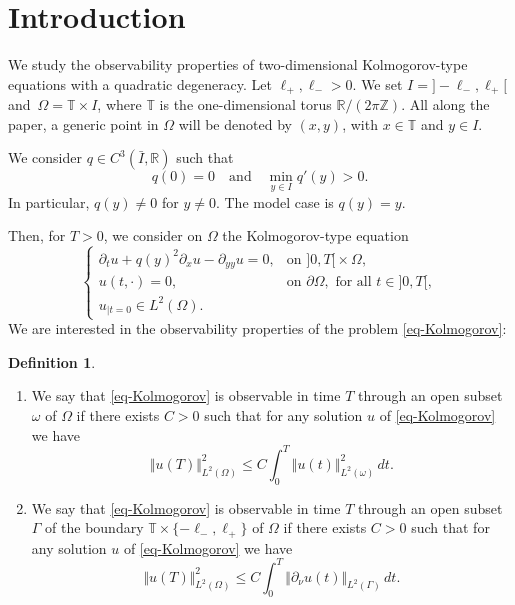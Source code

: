 \documentclass[JEP,XML,SOM,Unicode]{cedram}
\theoremstyle{plain}
\theoremstyle{definition}
\newtheorem{definition}[theorem]{Definition}
\newcommand{\nr}[1]{\Vert #1\Vert}
\newcommand{\1}{\mathds 1}
\newcommand{\R}{\mathbb{R}}
\newcommand{\Z}{\mathbb{Z}}
\newcommand{\T}{\mathbb{T}}
\let\G\Gamma
\let\o\omega
\let\O\Omega
\begin{document}
\maketitle
\vspace*{-\baselineskip}\enlargethispage{\baselineskip}%
\tableofcontents
\mainmatter

\section{Introduction}

We study the observability properties of two-dimensional Kolmogorov-type equations with a quadratic degeneracy. Let $\ell_+, \ell_- >0$. We set $I ={} ]-\ell_-,\ell_+[$ and~$\O = \T \times I$, where $\T$ is the one-dimensional torus $\R / (2 \pi \Z)$. All along the paper, a generic point in $\O$ will be denoted by $(x,y)$, with $x \in \T$ and $y \in I$.

We consider $q \in C^3 (\bar I,\R)$ such that
\[
q(0) = 0 \quad \text{and} \quad \min_{y \in I} q'(y) > 0.
\]
In particular, $q(y) \neq 0$ for $y \neq 0$. The model case is $q(y) = y$.

Then, for $T > 0$, we consider on $\O$ the Kolmogorov-type equation
\begin{equation} \label{eq-Kolmogorov}
\begin{cases}
\partial_t u + q(y)^2 \partial_x u - \partial_{yy} u = 0, & \text{on } ]0,T[{}\times \O,\\
u(t,\cdot) = 0, & \text{on } \partial\O, \text{ for all } t \in{}]0,T[,\\
u_{|t=0} \in L^2 (\O).
\end{cases}
\end{equation}
We are interested in the observability properties of the problem \eqref{eq-Kolmogorov}:

\skpt
\begin{definition}
\begin{enumerate}
\item We say that \eqref{eq-Kolmogorov} is observable in time $T$ through an open subset $\omega$ of $\O$ if there exists $C > 0$ such that for any solution $u$ of \eqref{eq-Kolmogorov} we have
\begin{equation} \label{eq-obs-vol}
\nr{u(T)}_{L^2(\O)}^2 \leq C \int_0^T \nr{u(t)}_{L^2(\o)}^2 \, dt.
\end{equation}
\item We say that \eqref{eq-Kolmogorov} is observable in time $T$ through an open subset $\Gamma$ of the boundary $\T \times \{-\ell_-,\ell_+\}$ of $\O$ if there exists $C > 0$ such that for any solution $u$ of \eqref{eq-Kolmogorov} we have
\begin{equation} \label{eq-obs-Gamma}
\nr{u(T)}_{L^2(\O)}^2 \leq C \int_0^T \nr{\partial_\nu u(t)}_{L^2(\G)} \, dt.
\end{equation}
\end{enumerate}
\end{definition}
\end{document}
